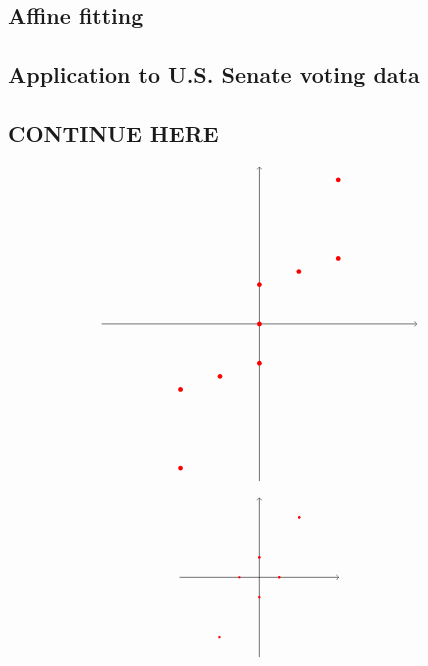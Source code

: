 \subsection{Affine fitting}



\subsection{Application to U.S. Senate voting data}




\subsection*{CONTINUE HERE}

\begin{equation*}
  \begin{tikzpicture}[scale=0.33]
    \draw[thin,->] (-12,0) -- (12,0);
    \draw[thin,->] (0,-12) -- (0,12);
    \fill[color=red] (-3,-4) circle (0.18);
    \fill[color=red] (6,5) circle (0.18);
    \fill[color=red] (6,11) circle (0.18);
    \fill[color=red] (-6,-5) circle (0.18);
    \fill[color=red] (3,4) circle (0.18);
    \fill[color=red] (-6,-11) circle (0.18);
    \fill[color=red] (0,-3) circle (0.18);
    \fill[color=red] (0,3) circle (0.18);
    \fill[color=red] (0, 0) circle (0.18);
  \end{tikzpicture}
\end{equation*}

\begin{equation*}
  \begin{tikzpicture}[scale=0.5]
    \draw[thin,->] (-4,0) -- (4,0);
    \draw[thin,->] (0,-4) -- (0,4);
    \fill[color=red] (0,1) circle (0.06);
    \fill[color=red] (1,0) circle (0.06);
    \fill[color=red] (0,-1) circle (0.06);
    \fill[color=red] (2, 3) circle (0.06);
    \fill[color=red] (-2, -3) circle (0.06);
    \fill[color=red] (0, 1) circle (0.06);
    \fill[color=red] (1, 0) circle (0.06);
    \fill[color=red] (2, 3) circle (0.06);
    \fill[color=red] (-1, 0) circle (0.06);
  \end{tikzpicture}
\end{equation*}


